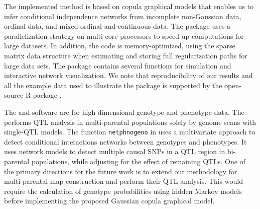 The implemented method is based on copula graphical models that enables us to infer conditional independence networks from incomplete non-Gaussian data, ordinal data, and mixed ordinal-and-continuous data. The package uses a parallelization strategy on multi-core processors to speed-up computations for large datasets. In addition, the code is memory-optimized, using the sparse matrix data structure when estimating and storing full regularization paths for large data sets. The  package contains several functions for simulation and interactive network visualization. We note that reproducibility of our results and all the example data used to illustrate the package is supported by the open-source R package .

The  and  \citep{broman2019r} software are for high-dimensional genotype and phenotype data. The  performs QTL analysis in multi-parental populations solely by genome scans with single-QTL models. The function {\tt netphnogeno} in  uses a multivariate approach to detect conditional interactions networks between genotypes and phenotypes. It uses network models to detect multiple causal SNPs in a QTL region in bi-parental populations, while adjusting for the effect of remaining QTLs. One of the primary directions for the future work is to extend our methodology for multi-parental map construction and perform their QTL analysis. This would require the calculation of genotype probabilities using hidden Markov models \citep{broman2009guide, zheng2018accurate} before implementing the proposed Gaussian copula graphical model. %

